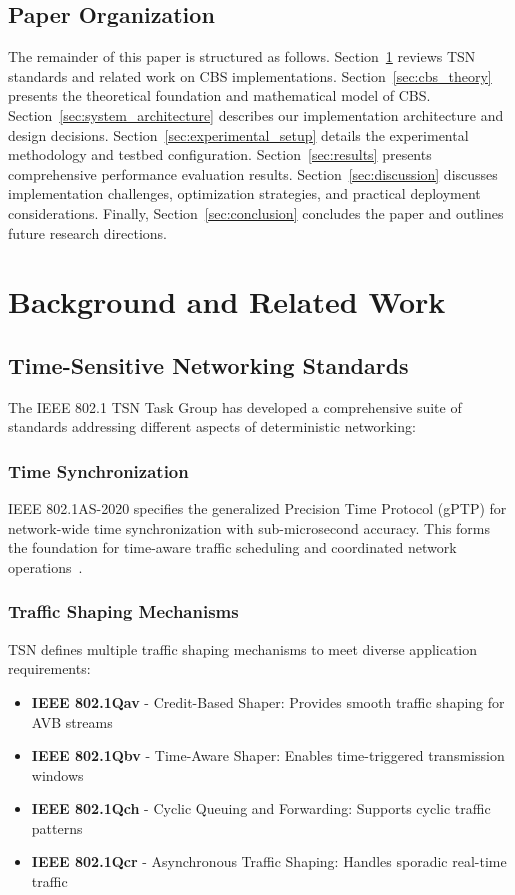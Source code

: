 \documentclass[10pt, journal, compsoc]{IEEEtran}
\begin{document}
\subsection{Paper Organization}

The remainder of this paper is structured as follows. Section~\ref{sec:background} reviews TSN standards and related work on CBS implementations. Section~\ref{sec:cbs_theory} presents the theoretical foundation and mathematical model of CBS. Section~\ref{sec:system_architecture} describes our implementation architecture and design decisions. Section~\ref{sec:experimental_setup} details the experimental methodology and testbed configuration. Section~\ref{sec:results} presents comprehensive performance evaluation results. Section~\ref{sec:discussion} discusses implementation challenges, optimization strategies, and practical deployment considerations. Finally, Section~\ref{sec:conclusion} concludes the paper and outlines future research directions.

\section{Background and Related Work}
\label{sec:background}

\subsection{Time-Sensitive Networking Standards}

The IEEE 802.1 TSN Task Group has developed a comprehensive suite of standards addressing different aspects of deterministic networking:

\subsubsection{Time Synchronization}
IEEE 802.1AS-2020 specifies the generalized Precision Time Protocol (gPTP) for network-wide time synchronization with sub-microsecond accuracy. This forms the foundation for time-aware traffic scheduling and coordinated network operations~\cite{ieee8021as}.

\subsubsection{Traffic Shaping Mechanisms}
TSN defines multiple traffic shaping mechanisms to meet diverse application requirements:

\begin{itemize}
    \item \textbf{IEEE 802.1Qav} - Credit-Based Shaper: Provides smooth traffic shaping for AVB streams
    \item \textbf{IEEE 802.1Qbv} - Time-Aware Shaper: Enables time-triggered transmission windows
    \item \textbf{IEEE 802.1Qch} - Cyclic Queuing and Forwarding: Supports cyclic traffic patterns
    \item \textbf{IEEE 802.1Qcr} - Asynchronous Traffic Shaping: Handles sporadic real-time traffic
\end{itemize}
\end{document}
